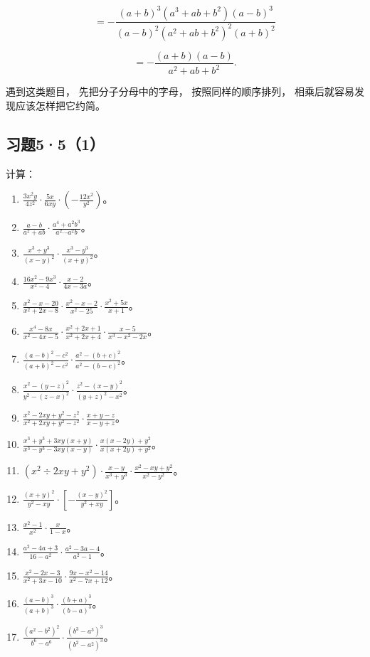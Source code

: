 \[
= - \frac{(a + b) ^{3} (a ^{3} + a b + b ^{2}) (a - b) ^{3}}{(a - b) ^{2} (a ^{2} + a b + b ^{2}) ^{2} (a + b) ^{2}}
\]

\[
= - \frac{(a + b) (a - b)}{a ^{2} + a b + b ^{2}}.
\]

 遇到这类题目， 先把分子分母中的字母，
按照同样的顺序排列， 相乘后就容易发现应该怎样把它约简。

\subsection{习题5·5（1）}

计算：

\begin{enumerate}[start=1]
\item
  \(\frac{3x^2y}{4z^2} \cdot \frac{5x}{6xy} \cdot \left(-\frac{12x^2}{y^2}\right)\)。
\item
  \(\frac{a - b}{a^2 + ab} \cdot \frac{a^4 + a^2b^3}{a^2 \cdots a^2b}\)。
\item
  \(\frac{x^3 \div y^3}{(x - y)^2} \cdot \frac{x^3 - y^3}{(x + y)^2}\)。
\item
  \(\frac{16x^2 - 9x^3}{x^2 - 4} \cdot \frac{x - 2}{4x - 3a}\)。
\item
  \(\frac{x^2 - x - 20}{x^2 + 2x - 8} \cdot \frac{x^2 - x - 2}{x^2 - 25} \cdot \frac{x^2 + 5x}{x + 1}\)。
\item
  \(\frac{x^4 - 8x}{x^2 - 4x - 5} \cdot \frac{x^2 + 2x + 1}{x^2 + 2x + 4} \cdot \frac{x - 5}{x^3 - x^2 - 2x}\)。
\item
  \(\frac{(a - b)^2 - c^2}{(a + b)^2 - c^2} \cdot \frac{a^2 - (b + c)^2}{a^2 - (b - c)^2}\)。
\item
  \(\frac{x^2 - (y - z)^2}{y^2 - (z - x)^2} \cdot \frac{z^2 - (x - y)^2}{(y + z)^2 - x^2}\)。
\item
  \(\frac{x^2 - 2xy + y^2 - z^2}{x^2 + 2xy + y^2 - z^2} \cdot \frac{x + y - z}{x - y + z}\)。
\item
  \(\frac{x^3 + y^3 + 3xy(x + y)}{x^3 - y^3 - 3xy(x - y)} \cdot \frac{x(x - 2y) + y^2}{x(x + 2y) + y^2}\)。
\item
  \((x^{2} \div 2xy + y^{2}) \cdot \frac{x - y}{x^{3} + y^{3}} \cdot \frac{x^{2} - xy + y^{2}}{x^{2} - y^{2}}\)。
\item
  \(\frac{(x + y)^2}{y^2 - xy} \cdot \left[-\frac{(x - y)^2}{y^2 + xy}\right]\)。
\item
  \(\frac{x^2 - 1}{x^2} \cdot \frac{x}{1 - x}\)。
\item
  \(\frac{a^2 - 4a + 3}{16 - a^2} \cdot \frac{a^2 - 3a - 4}{a^2 - 1}\)。
\item
  \(\frac{x^2 - 2x - 3}{x^2 + 3x - 10} \cdot \frac{9x - x^2 - 14}{x^2 - 7x + 12}\)。
\item
  \(\frac{(a - b)^3}{(a + b)^3} \cdot \frac{(b + a)^3}{(b - a)^3}\)。
\item
  \(\frac{(a^2 - b^2)^2}{b^6 - a^6} \cdot \frac{(b^3 - a^3)^3}{(b^2 - a^2)^3}\)。
\end{enumerate}

